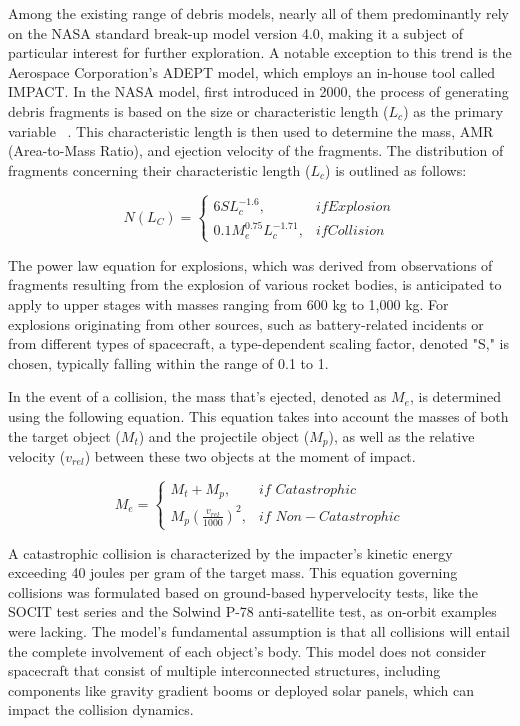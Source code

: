 \documentclass[11pt]{article} %
\begin{document}
Among the existing range of debris models, nearly all of them predominantly rely on the NASA standard break-up model version 4.0, making it a subject of particular interest for further exploration. A notable exception to this trend is the Aerospace Corporation's ADEPT model, which employs an in-house tool called IMPACT. In the NASA model, first introduced in 2000, the process of generating debris fragments is based on the size or characteristic length ($L_c$) as the primary variable ~\cite{jenkins_strathcube_2021}. This characteristic length is then used to determine the mass, AMR (Area-to-Mass Ratio), and ejection velocity of the fragments. The distribution of fragments concerning their characteristic length ($L_c$) is outlined as follows:

$$
N(L_C) = \begin{cases} 
            6 S L_c^{-1.6}, & \textit{}{if } \textit{}{Explosion}\\
            0.1 M_e^{0.75} L_c^{-1.71}, & \textit{}{if } \textit{}{Collision}
\end{cases}
$$

The power law equation for explosions, which was derived from observations of fragments resulting from the explosion of various rocket bodies, is anticipated to apply to upper stages with masses ranging from 600 kg to 1,000 kg. For explosions originating from other sources, such as battery-related incidents or from different types of spacecraft, a type-dependent scaling factor, denoted "S," is chosen, typically falling within the range of 0.1 to 1.

In the event of a collision, the mass that's ejected, denoted as $M_e$, is determined using the following equation. This equation takes into account the masses of both the target object ($M_t$) and the projectile object ($M_p$), as well as the relative velocity ($v_{rel}$) between these two objects at the moment of impact.

$$
M_e= \begin{cases}
    M_t + M_p, & \textit{if } \textit{}{Catastrophic} \\
    M_p\left( \frac{v_{rel}}{1000} \right)^2, & \textit{if } \textit{}{Non-Catastrophic}
\end{cases}
$$

A catastrophic collision is characterized by the impacter's kinetic energy exceeding 40 joules per gram of the target mass. This equation governing collisions was formulated based on ground-based hypervelocity tests, like the SOCIT test series and the Solwind P-78 anti-satellite test, as on-orbit examples were lacking. The model's fundamental assumption is that all collisions will entail the complete involvement of each object's body. This model does not consider spacecraft that consist of multiple interconnected structures, including components like gravity gradient booms or deployed solar panels, which can impact the collision dynamics.
\end{document}
